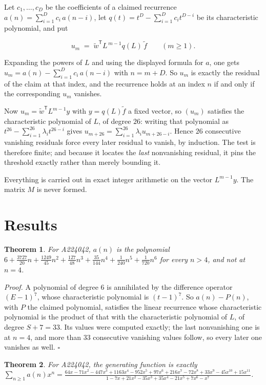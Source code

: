 \documentclass[11pt]{article}
\newtheorem{theorem}{Theorem}
\theoremstyle{definition}
\begin{document}
Let $c_1,\dots,c_D$ be the coefficients of a claimed recurrence $a(n) = \sum_{i=1}^{D} c_i\,a(n-i)$, let $q(t) = t^{D} - \sum_{i=1}^{D} c_i t^{D-i}$ be its characteristic polynomial, and put

\[u_m \;=\; \tilde w^{\mathsf T} L^{\,m-1} q(L)\,\tilde f \qquad (m \ge 1).\]

Expanding the powers of $L$ and using the displayed formula for $a$, one gets $u_m = a(n) - \sum_{i=1}^{D} c_i\,a(n-i)$ with $n = m + D$. So $u_m$ is exactly the residual of the claim at that index, and the recurrence holds at an index $n$ if and only if the corresponding $u_m$ vanishes.

Now $u_m = \tilde w^{\mathsf T} L^{m-1} y$ with $y = q(L)\tilde f$ a fixed vector, so $(u_m)$ satisfies the characteristic polynomial of $L$, of degree $26$: writing that polynomial as $t^{26} - \sum_{i=1}^{26} \lambda_i t^{26-i}$ gives $u_{m+26} = \sum_{i=1}^{26} \lambda_i u_{m+26-i}$. Hence $26$ consecutive vanishing residuals force every later residual to vanish, by induction. The test is therefore finite; and because it locates the {\itshape last} nonvanishing residual, it pins the threshold exactly rather than merely bounding it.

Everything is carried out in exact integer arithmetic on the vector $L^{m-1}y$. The matrix $M$ is never formed.

\section{Results}

\begin{theorem} For A224042, $a(n)$ is the polynomial $6 + \frac{3727}{20}n + \frac{1249}{45}n^{2} + \frac{127}{48}n^{3} + \frac{35}{144}n^{4} + \frac{1}{240}n^{5} + \frac{1}{720}n^{6}$ for every $n > 4$, and not at $n = 4$.\end{theorem}

{\itshape Proof.} A polynomial of degree $6$ is annihilated by the difference operator $(E-1)^{7}$, whose characteristic polynomial is $(t-1)^{7}$. So $a(n) - P(n)$, with $P$ the claimed polynomial, satisfies the linear recurrence whose characteristic polynomial is the product of that with the characteristic polynomial of $L$, of degree $S + 7 = 33$. Its values were computed exactly; the last nonvanishing one is at $n = 4$, and more than $33$ consecutive vanishing values follow, so every later one vanishes as well. $\square$

\begin{theorem} For A224042, the generating function is exactly $\sum_{n\ge 1} a(n)x^n = \frac{64x - 71x^{2} - 447x^{3} + 1163x^{4} - 952x^{5} + 97x^{6} + 216x^{7} - 72x^{8} + 33x^{9} - 45x^{10} + 15x^{11}}{1 - 7x + 21x^{2} - 35x^{3} + 35x^{4} - 21x^{5} + 7x^{6} - x^{7}}$.\end{theorem}
\end{document}
